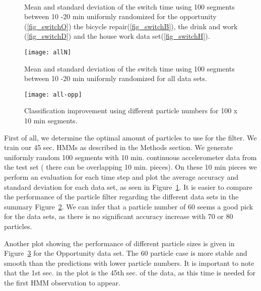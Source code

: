 \begin{figure}[!t]
\centering
\begin{center}
      \\   \end{center} 
     \caption[Particle filter mean and Standard deviation]{Mean and standard deviation of the switch time using 100 segments 
between 10 -20 min uniformly randomized for the opportunity (\ref{fig_switchO})
the bicycle repair(\ref{fig_switchB}), the drink and work (\ref{fig_switchD}) and
the house work data set(\ref{fig_switchH}).}
\label{fig:switch}
\end{figure}

\begin{figure}[!t]
\centering
\texttt{[image: allN]}
\caption[Particle filter results, all datasets]{Mean and standard deviation of the switch time using 100 segments 
between 10 -20 min uniformly randomized for all data sets.}
\label{fig_allN}
\end{figure}


\begin{figure}[!t]
\centering
\texttt{[image: all-opp]}
\caption[Improvement using different particle numbers]{Classification improvement using different particle numbers for 100 x  10 min segments.}
\label{fig_particle}
\end{figure}


First of all, we determine the optimal amount of particles to use for
the filter.  We train our 45 sec. HMMs as
described in the Methods section.  We generate uniformly random 100
segments with 10 min. continuous accelerometer data from the test set
( there can be overlapping 10 min. pieces). On these 10 min pieces we
perform an evaluation for each time step and plot the average accuracy
and standard deviation for each data set, as seen in Figure~\ref{fig:switch}.
It is easier to compare the performance of the particle filter regarding
the different data sets in the summary Figure~\ref{fig_allN}.  
We can infer that a particle number of 60 seems a good pick for the data sets, as there is
no significant accuracy increase with 70 or 80 particles.

Another plot showing the performance of different particle sizes
is given in Figure~\ref{fig_particle} for the Opportunity data set.
The 60 particle case is more stable and smooth than the predictions with lower
particle numbers. It is important to note that the 1st sec. in the plot is the 45th sec. of the data, 
as this time is needed for the first HMM observation to appear.  

